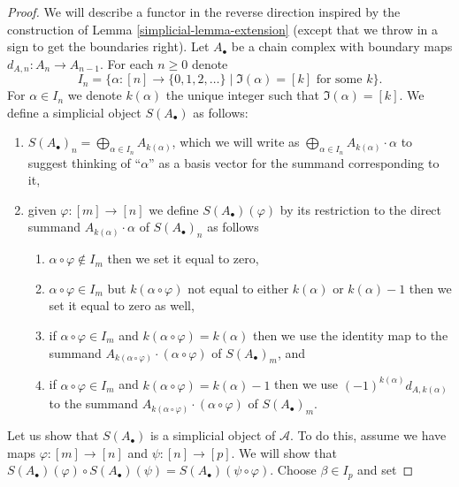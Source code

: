 \begin{proof}

We will describe a functor in the reverse direction
inspired by the construction of Lemma \ref{simplicial-lemma-extension}
(except that we throw in a sign to get the boundaries
right). Let $A_\bullet$ be a chain complex with boundary maps
$d_{A, n} : A_n \to A_{n - 1}$. For each $n \geq 0$ denote
$$
I_n =
\Big\{
\alpha : [n] \to \{0, 1, 2, \ldots\}
\mid
\Im(\alpha) = [k]\text{ for some }k
\Big\}.
$$
For $\alpha \in I_n$ we denote $k(\alpha)$ the unique
integer such that $\Im(\alpha) = [k]$.
We define a simplicial object $S(A_\bullet)$ as follows:
\begin{enumerate}
\item $S(A_\bullet)_n = \bigoplus_{\alpha \in I_n} A_{k(\alpha)}$, which
we will write as
$\bigoplus_{\alpha \in I_n} A_{k(\alpha)} \cdot \alpha$
to suggest thinking of ``$\alpha$'' as a basis vector for the
summand corresponding to it,
\item given $\varphi : [m] \to [n]$ we define
$S(A_\bullet)(\varphi)$ by its restriction to
the direct summand $A_{k(\alpha)} \cdot \alpha$
of $S(A_\bullet)_n$ as follows
\begin{enumerate}
\item $\alpha \circ \varphi \not \in I_m$ then we set it equal to zero,
\item $\alpha \circ \varphi \in I_m$ but $k(\alpha \circ \varphi)$
not equal to either $k(\alpha)$ or $k(\alpha) - 1$ then we set it
equal to zero as well,
\item if $\alpha \circ \varphi \in I_m$
and $k(\alpha \circ \varphi) = k(\alpha)$ then we use
the identity map to the summand
$A_{k(\alpha \circ \varphi)} \cdot (\alpha \circ \varphi)$
of $S(A_\bullet)_m$, and
\item if $\alpha \circ \varphi \in I_m$
and $k(\alpha \circ \varphi) = k(\alpha) - 1$
then we use $(-1)^{k(\alpha)} d_{A, k(\alpha)}$ to the summand
$A_{k(\alpha \circ \varphi)}\cdot (\alpha \circ \varphi)$
of $S(A_\bullet)_m$.
\end{enumerate}
\end{enumerate}
Let us show that $S(A_\bullet)$ is a simplicial object of $\mathcal{A}$.
To do this, assume we have maps $\varphi : [m] \to [n]$ and
$\psi : [n] \to [p]$. We will show that
$S(A_\bullet)(\varphi) \circ S(A_\bullet)(\psi) =
S(A_\bullet)(\psi \circ \varphi)$. Choose $\beta \in I_p$ and set

\end{proof}
